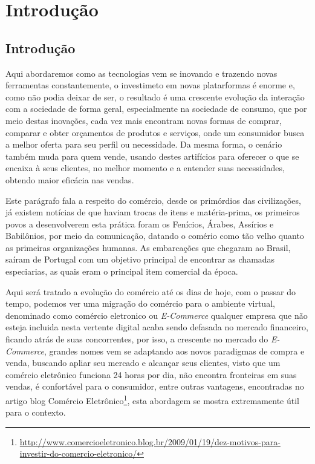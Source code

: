 \part{Introdução}
\chapter[Introdução]{Introdução}

Aqui abordaremos como as tecnologias vem se inovando e trazendo novas ferramentas constantemente, o investimeto em novas platarformas é enorme e, como não podia deixar de ser, o resultado é uma crescente evolução da interação com a sociedade de forma geral, especialmente na sociedade de consumo, que por meio destas inovações, cada vez mais encontram novas formas de comprar, comparar e obter orçamentos de produtos e serviços, onde um consumidor busca a melhor oferta para seu perfil ou necessidade. Da mesma forma, o cenário também muda para quem vende, usando destes artifícios para oferecer o que se encaixa à seus clientes, no melhor momento e a entender suas necessidades, obtendo maior eficácia nas vendas.

Este parágrafo fala a respeito do comércio, desde os primórdios das civilizações, já existem notícias de que haviam trocas de itens e matéria-prima, os primeiros povos a desenvolverem esta prática foram os Fenícios, Árabes, Assírios e Babilônios, por meio da comunicação, datando o comério como tão velho quanto as primeiras organizações humanas. As embarcações que chegaram ao Brasil, saíram de Portugal com um objetivo principal de encontrar as chamadas especiarias, as quais eram o principal item comercial da época\cite{furtado:2009}.

Aqui será tratado a evolução do comércio até os dias de hoje, com o passar do tempo, podemos ver uma migração do comércio para o ambiente virtual, denominado como comércio eletronico ou \textit{E-Commerce} qualquer empresa que não esteja incluida nesta vertente digital acaba sendo defasada no mercado financeiro, ficando atrás de suas concorrentes\cite{roque:2012}, por isso, a crescente no mercado do \textit{E-Commerce}, grandes nomes vem se adaptando aos novos paradigmas de compra e venda, buscando apliar seu mercado e alcançar seus clientes, visto que um comércio eletrônico funciona 24 horas por dia, não encontra fronteiras em suas vendas, é confortável para o consumidor, entre outras vantagens, encontradas no artigo blog Comércio Eletrônico\footnote{\url{http://www.comercioeletronico.blog.br/2009/01/19/dez-motivos-para-investir-do-comercio-eletronico/}}, esta abordagem se mostra extremamente útil para o contexto.

